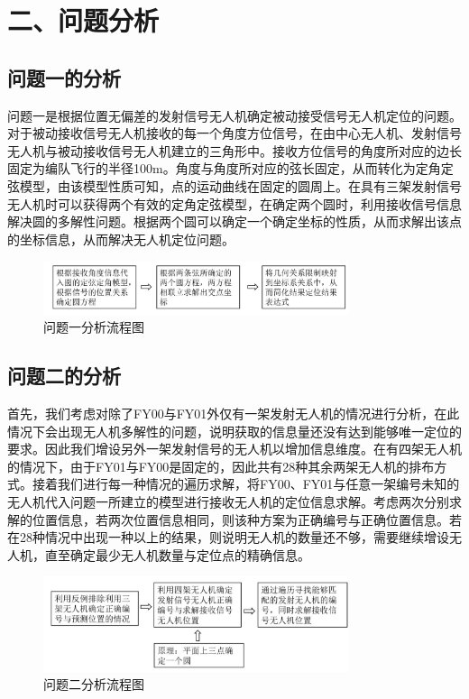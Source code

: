 \documentclass{my_paper}
\begin{document}
\section{二、问题分析}
\subsection{问题一的分析}
问题一是根据位置无偏差的发射信号无人机确定被动接受信号无人机定位的问题。对于被动接收信号无人机接收的每一个角度方位信号，在由中心无人机、发射信号无人机与被动接收信号无人机建立的三角形中。接收方位信号的角度所对应的边长固定为编队飞行的半径100m。角度与角度所对应的弦长固定，从而转化为定角定弦模型，由该模型性质可知，点的运动曲线在固定的圆周上。在具有三架发射信号无人机时可以获得两个有效的定角定弦模型，在确定两个圆时，利用接收信号信息解决圆的多解性问题。根据两个圆可以确定一个确定坐标的性质，从而求解出该点的坐标信息，从而解决无人机定位问题。

\begin{figure}[h]
    \centering
    \includegraphics[width=0.8\textwidth]{images/liuchengtu1.jpg}
    \caption{问题一分析流程图}
    \label{liuchengtu1}
\end{figure}

\subsection{问题二的分析}

首先，我们考虑对除了FY00与FY01外仅有一架发射无人机的情况进行分析，在此情况下会出现无人机多解性的问题，说明获取的信息量还没有达到能够唯一定位的要求。因此我们增设另外一架发射信号的无人机以增加信息维度。在有四架无人机的情况下，由于FY01与FY00是固定的，因此共有28种其余两架无人机的排布方式。接着我们进行每一种情况的遍历求解，将FY00、FY01与任意一架编号未知的无人机代入问题一所建立的模型进行接收无人机的定位信息求解。考虑两次分别求解的位置信息，若两次位置信息相同，则该种方案为正确编号与正确位置信息。若在28种情况中出现一种以上的结果，则说明无人机的数量还不够，需要继续增设无人机，直至确定最少无人机数量与定位点的精确信息。

\begin{figure}[h]
    \centering
    \includegraphics[width=0.8\textwidth]{images/liuchengtu2.jpg}
    \caption{问题二分析流程图}
    \label{liuchengtu2}
\end{figure}
\end{document}
